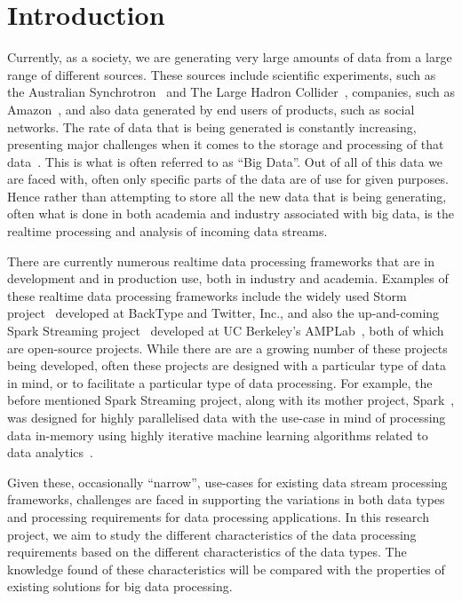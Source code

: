 \documentclass[a4paper,11pt]{article}
\begin{document}

\section{Introduction} %
\label{sec:introduction}

Currently, as a society, we are generating very large amounts of data from a large range of different sources. These
sources include scientific experiments, such as the Australian Synchrotron~\cite{web:synchrotron} and The Large Hadron
Collider~\cite{web:LHC}, companies, such as Amazon~\cite{web:Amazon}, and also data generated by end users of products,
such as social networks. The rate of data that is being generated is constantly increasing, presenting major challenges
when it comes to the storage and processing of that data~\cite{bohlouli_towards_2013}. This is what is often referred to
as ``Big Data''. Out of all of this data we are faced with, often only specific parts of the data are of use for given
purposes. Hence rather than attempting to store all the new data that is being generating, often what is done in both
academia and industry associated with big data, is the realtime processing and analysis of incoming data streams.

There are currently numerous realtime data processing frameworks that are in development and in production use, both in
industry and academia. Examples of these realtime data processing frameworks include the widely used Storm
project~\cite{web:Storm} developed at BackType and Twitter, Inc., and also the up-and-coming Spark Streaming
project~\cite{web:SparkStreaming} developed at UC Berkeley's AMPLab~\cite{web:UCBerkelyAMCLab}, both of which are
open-source projects. While there are are a growing number of these projects being developed, often these projects are
designed with a particular type of data in mind, or to facilitate a particular type of data processing. For example, the
before mentioned Spark Streaming project, along with its mother project, Spark~\cite{web:Spark}, was designed for highly parallelised
data with the use-case in mind of processing data in-memory using highly iterative machine learning algorithms related
to data analytics~\cite{liu_survey_2014}.

Given these, occasionally ``narrow'', use-cases for existing data stream processing frameworks, challenges are faced in
supporting the variations in both data types and processing requirements for data processing applications. In this
research project, we aim to study the different characteristics of the data processing requirements based on the
different characteristics of the data types. The knowledge found of these characteristics will be compared with the
properties of existing solutions for big data processing.
\end{document}
